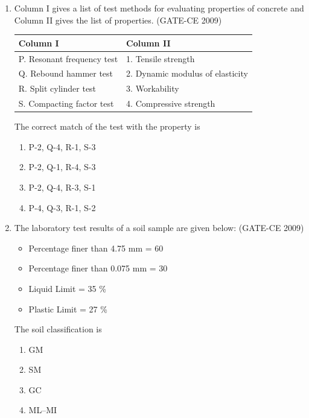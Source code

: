 \documentclass[journal,12pt,onecolumn]{article}
\theoremstyle{remark}
\begin{document}
\begin{enumerate}
    \item Column I gives a list of test methods for evaluating properties of concrete and Column II gives the list of properties. (GATE-CE 2009)
    \begin{center}
    \begin{tabular}{|l|l|}
    \hline
    \textbf{Column I} & \textbf{Column II} \\
    \hline
    P. Resonant frequency test & 1. Tensile strength \\
    Q. Rebound hammer test & 2. Dynamic modulus of elasticity \\
    R. Split cylinder test & 3. Workability \\
    S. Compacting factor test & 4. Compressive strength \\
    \hline
    \end{tabular}
    \end{center}
    The correct match of the test with the property is
    \begin{enumerate}
        \item P-2, Q-4, R-1, S-3 
        \item P-2, Q-1, R-4, S-3 
        \item P-2, Q-4, R-3, S-1 
        \item P-4, Q-3, R-1, S-2
    \end{enumerate}
    
    \item The laboratory test results of a soil sample are given below: (GATE-CE 2009)
    \begin{itemize}
        \item Percentage finer than 4.75 mm = 60
        \item Percentage finer than 0.075 mm = 30
        \item Liquid Limit = 35 \%
        \item Plastic Limit = 27 \%
    \end{itemize}
    The soil classification is
    \begin{enumerate}
        \item GM 
        \item SM 
        \item GC 
        \item ML--MI
    \end{enumerate}
    

\end{enumerate}
\end{document}
